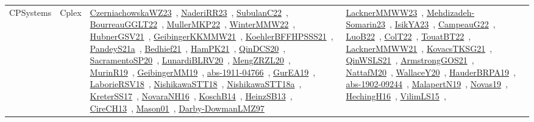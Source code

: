 {\begin{longtable}{lp{3cm}>{\raggedright\arraybackslash}p{6cm}>{\raggedright\arraybackslash}p{6cm}>{\raggedright\arraybackslash}p{8cm}}
CPSystems & Cplex & \href{articles/CzerniachowskaWZ23.pdf}{CzerniachowskaWZ23}~\cite{CzerniachowskaWZ23}, \href{articles/NaderiRR23.pdf}{NaderiRR23}~\cite{NaderiRR23}, \href{articles/SubulanC22.pdf}{SubulanC22}~\cite{SubulanC22}, \href{articles/BourreauGGLT22.pdf}{BourreauGGLT22}~\cite{BourreauGGLT22}, \href{articles/MullerMKP22.pdf}{MullerMKP22}~\cite{MullerMKP22}, \href{papers/WinterMMW22.pdf}{WinterMMW22}~\cite{WinterMMW22}, \href{articles/HubnerGSV21.pdf}{HubnerGSV21}~\cite{HubnerGSV21}, \href{papers/GeibingerKKMMW21.pdf}{GeibingerKKMMW21}~\cite{GeibingerKKMMW21}, \href{articles/KoehlerBFFHPSSS21.pdf}{KoehlerBFFHPSSS21}~\cite{KoehlerBFFHPSSS21}, \href{articles/PandeyS21a.pdf}{PandeyS21a}~\cite{PandeyS21a}, \href{articles/Bedhief21.pdf}{Bedhief21}~\cite{Bedhief21}, \href{articles/HamPK21.pdf}{HamPK21}~\cite{HamPK21}, \href{articles/QinDCS20.pdf}{QinDCS20}~\cite{QinDCS20}, \href{articles/SacramentoSP20.pdf}{SacramentoSP20}~\cite{SacramentoSP20}, \href{articles/LunardiBLRV20.pdf}{LunardiBLRV20}~\cite{LunardiBLRV20}, \href{articles/MengZRZL20.pdf}{MengZRZL20}~\cite{MengZRZL20}, \href{papers/MurinR19.pdf}{MurinR19}~\cite{MurinR19}, \href{papers/GeibingerMM19.pdf}{GeibingerMM19}~\cite{GeibingerMM19}, \href{articles/abs-1911-04766.pdf}{abs-1911-04766}~\cite{abs-1911-04766}, \href{articles/GurEA19.pdf}{GurEA19}~\cite{GurEA19}, \href{articles/LaborieRSV18.pdf}{LaborieRSV18}~\cite{LaborieRSV18}, \href{papers/NishikawaSTT18.pdf}{NishikawaSTT18}~\cite{NishikawaSTT18}, \href{papers/NishikawaSTT18a.pdf}{NishikawaSTT18a}~\cite{NishikawaSTT18a}, \href{articles/KreterSS17.pdf}{KreterSS17}~\cite{KreterSS17}, \href{articles/NovaraNH16.pdf}{NovaraNH16}~\cite{NovaraNH16}, \href{papers/KoschB14.pdf}{KoschB14}~\cite{KoschB14}, \href{articles/HeinzSB13.pdf}{HeinzSB13}~\cite{HeinzSB13}, \href{papers/CireCH13.pdf}{CireCH13}~\cite{CireCH13}, \href{articles/Mason01.pdf}{Mason01}~\cite{Mason01}, \href{articles/Darby-DowmanLMZ97.pdf}{Darby-DowmanLMZ97}~\cite{Darby-DowmanLMZ97} & \href{articles/LacknerMMWW23.pdf}{LacknerMMWW23}~\cite{LacknerMMWW23}, \href{papers/Mehdizadeh-Somarin23.pdf}{Mehdizadeh-Somarin23}~\cite{Mehdizadeh-Somarin23}, \href{articles/IsikYA23.pdf}{IsikYA23}~\cite{IsikYA23}, \href{articles/CampeauG22.pdf}{CampeauG22}~\cite{CampeauG22}, \href{papers/LuoB22.pdf}{LuoB22}~\cite{LuoB22}, \href{articles/ColT22.pdf}{ColT22}~\cite{ColT22}, \href{papers/TouatBT22.pdf}{TouatBT22}~\cite{TouatBT22}, \href{papers/LacknerMMWW21.pdf}{LacknerMMWW21}~\cite{LacknerMMWW21}, \href{papers/KovacsTKSG21.pdf}{KovacsTKSG21}~\cite{KovacsTKSG21}, \href{articles/QinWSLS21.pdf}{QinWSLS21}~\cite{QinWSLS21}, \href{papers/ArmstrongGOS21.pdf}{ArmstrongGOS21}~\cite{ArmstrongGOS21}, \href{papers/NattafM20.pdf}{NattafM20}~\cite{NattafM20}, \href{articles/WallaceY20.pdf}{WallaceY20}~\cite{WallaceY20}, \href{articles/HauderBRPA19.pdf}{HauderBRPA19}~\cite{HauderBRPA19}, \href{articles/abs-1902-09244.pdf}{abs-1902-09244}~\cite{abs-1902-09244}, \href{papers/MalapertN19.pdf}{MalapertN19}~\cite{MalapertN19}, \href{articles/Novas19.pdf}{Novas19}~\cite{Novas19}, \href{papers/HechingH16.pdf}{HechingH16}~\cite{HechingH16}, \href{papers/VilimLS15.pdf}{VilimLS15}~\cite{VilimLS15}, 
\end{longtable}}
